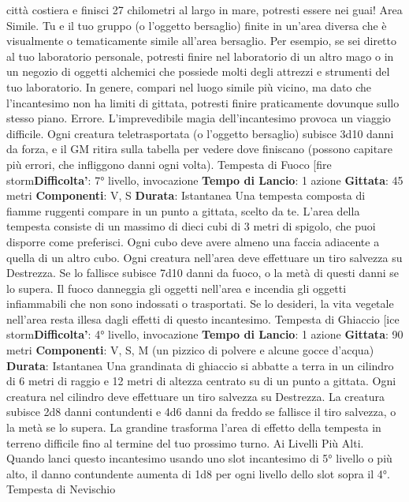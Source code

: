 \begin{multicols}{2}
città costiera e finisci 27 chilometri al largo in mare,
potresti essere nei guai!
Area Simile. Tu e il tuo gruppo (o l’oggetto bersaglio)
finite in un’area diversa che è visualmente o
tematicamente simile all’area bersaglio. Per esempio,
se sei diretto al tuo laboratorio personale, potresti finire
nel laboratorio di un altro mago o in un negozio di
oggetti alchemici che possiede molti degli attrezzi e
strumenti del tuo laboratorio. In genere, compari nel
luogo simile più vicino, ma dato che l’incantesimo non
ha limiti di gittata, potresti finire praticamente dovunque
sullo stesso piano.
Errore. L’imprevedibile magia dell’incantesimo provoca
un viaggio difficile. Ogni creatura teletrasportata (o
l’oggetto bersaglio) subisce 3d10 danni da forza, e il
GM ritira sulla tabella per vedere dove finiscano
(possono capitare più errori, che infliggono danni ogni
volta).
Tempesta di Fuoco
[fire storm\textbf{Difficolta'}:
7° livello, invocazione
\textbf{Tempo di Lancio}: 1 azione
\textbf{Gittata}: 45 metri
\textbf{Componenti}: V, S
\textbf{Durata}: Istantanea
Una tempesta composta di fiamme ruggenti compare in
un punto a gittata, scelto da te. L’area della tempesta
consiste di un massimo di dieci cubi di 3 metri di
spigolo, che puoi disporre come preferisci. Ogni cubo
deve avere almeno una faccia adiacente a quella di un
altro cubo. Ogni creatura nell’area deve effettuare un
tiro salvezza su Destrezza. Se lo fallisce subisce 7d10
danni da fuoco, o la metà di questi danni se lo supera.
Il fuoco danneggia gli oggetti nell’area e incendia gli
oggetti infiammabili che non sono indossati o
trasportati. Se lo desideri, la vita vegetale nell’area
resta illesa dagli effetti di questo incantesimo.
Tempesta di Ghiaccio
[ice storm\textbf{Difficolta'}:
4° livello, invocazione
\textbf{Tempo di Lancio}: 1 azione
\textbf{Gittata}: 90 metri
\textbf{Componenti}: V, S, M (un pizzico di polvere e alcune
gocce d’acqua)
\textbf{Durata}: Istantanea
Una grandinata di ghiaccio si abbatte a terra in un
cilindro di 6 metri di raggio e 12 metri di altezza centrato
su di un punto a gittata. Ogni creatura nel cilindro deve
effettuare un tiro salvezza su Destrezza. La creatura
subisce 2d8 danni contundenti e 4d6 danni da freddo
se fallisce il tiro salvezza, o la metà se lo supera.
La grandine trasforma l’area di effetto della tempesta in
terreno difficile fino al termine del tuo prossimo turno.
Ai Livelli Più Alti. Quando lanci questo incantesimo
usando uno slot incantesimo di 5° livello o più alto, il
danno contundente aumenta di 1d8 per ogni livello dello
slot sopra il 4°.
Tempesta di Nevischio

\end{multicols}
